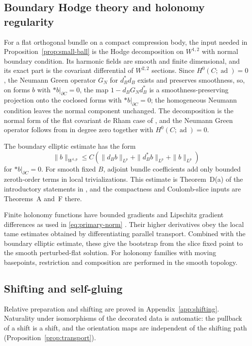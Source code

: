 \documentclass[11pt]{amsart}
\theoremstyle{definition}
\theoremstyle{remark}
\theoremstyle{plain}
\numberwithin{equation}{section}
\newcommand{\ad}{\operatorname{ad}}
\begin{document}
\subsection{Boundary Hodge theory and holonomy regularity}
For a flat orthogonal bundle on
a compact compression body,
the input needed in
Proposition~\ref{prop:small-ball}
is the Hodge decomposition on
$W^{1,2}$ with normal boundary
condition. Its harmonic fields
are smooth and finite
dimensional, and its exact
part is the covariant
differential of $W^{2,2}$
sections. Since
$H^0(C;\ad)=0$, the Neumann
Green operator $G_N$ for
$d_B^*d_B$ exists and
preserves smoothness, so, on forms $b$ with
$*b|_{\partial C}=0$, the map
$1-d_BG_Nd_B^*$ is a
smoothness-preserving
projection onto the coclosed
forms with $*b|_{\partial C}=0$;
the homogeneous Neumann
condition leaves the normal
component unchanged.
The decomposition is the normal
form of the flat covariant de Rham
case of
\cite[Section~1.6 and
Theorems~3.10--3.11]{KL}, and the
Neumann Green operator follows
from \cite[Theorem~3.10]{KL} in
degree zero together with
$H^0(C;\ad)=0$.

The boundary elliptic estimate
has the form
\[
 \|b\|_{W^{1,p}}\le C
 (\|d_Bb\|_{L^p}+\|d_B^*b\|_{L^p}
                              +\|b\|_{L^p})
\]
for $*b|_{\partial C}=0$.
For smooth fixed $B$, adjoint
bundle coefficients add only
bounded zeroth-order terms in
local trivializations. This
estimate is Theorem~D(a) of the
introductory statements in
\cite{Wehrheim-book}, and the
compactness and Coulomb-slice
inputs are Theorems~A and~F
there.

Finite holonomy functions have
bounded gradients and
Lipschitz gradient differences
as used in
\eqref{eq:primary-norm}
\cite[Proposition~6.1]{DFL}.
Their higher derivatives obey
the local tame estimates
obtained by differentiating
parallel transport. Combined
with the boundary elliptic
estimate, these give the
bootstrap from the slice
fixed point to the smooth
perturbed-flat solution.
For holonomy families with
moving basepoints, restriction
and composition are performed
in the smooth topology.

\subsection{Shifting and self-gluing}
Relative preparation and shifting are proved in
Appendix~\ref{app:shifting}. Naturality under isomorphisms of the
decorated data is automatic: the pullback of a shift is a shift, and the
orientation maps are independent of the shifting path
(Proposition~\ref{prop:transport}).
\end{document}
